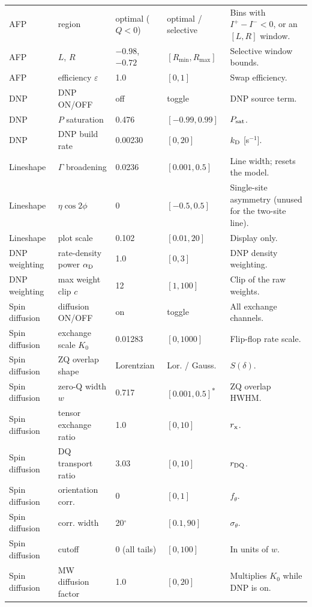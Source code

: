 \documentclass[11pt]{article}
\newcommand{\Iplus}{I^{+}}
\newcommand{\Iminus}{I^{-}}
\begin{document}
\begin{longtable}{@{}L{0.14\textwidth} L{0.20\textwidth} L{0.11\textwidth} L{0.14\textwidth} L{0.30\textwidth}@{}}
\midrule
AFP & region & optimal (\(Q<0\)) & optimal / selective & Bins with \(\Iplus-\Iminus<0\), or an \([L,R]\) window.\\
AFP & \(L\), \(R\) & \(-0.98\), \(-0.72\) & \([R_{\min},R_{\max}]\) & Selective window bounds.\\
AFP & efficiency \(\varepsilon\) & 1.0 & \([0,1]\) & Swap efficiency.\\
\midrule
DNP & DNP ON/OFF & off & toggle & DNP source term.\\
DNP & \(P\) saturation & 0.476 & \([-0.99,0.99]\) & \(P_{\rm sat}\).\\
DNP & DNP build rate & 0.00230 & \([0,20]\) & \(k_{\rm D}\) [s\(^{-1}\)].\\
\midrule
Lineshape & \(\Gamma\) broadening & 0.0236 & \([0.001,0.5]\) & Line width; resets the model.\\
Lineshape & \(\eta\cos2\phi\) & 0 & \([-0.5,0.5]\) & Single-site asymmetry (unused for the two-site line).\\
Lineshape & plot scale & 0.102 & \([0.01,20]\) & Display only.\\
\midrule
DNP weighting & rate-density power \(\alpha_{\rm D}\) & 1.0 & \([0,3]\) & DNP density weighting.\\
DNP weighting & max weight clip \(c\) & 12 & \([1,100]\) & Clip of the raw weights.\\
\midrule
Spin diffusion & diffusion ON/OFF & on & toggle & All exchange channels.\\
Spin diffusion & exchange scale \(K_0\) & 0.01283 & \([0,1000]\) & Flip-flop rate scale.\\
Spin diffusion & ZQ overlap shape & Lorentzian & Lor. / Gauss. & \(S(\delta)\).\\
Spin diffusion & zero-Q width \(w\) & 0.717 & \([0.001,0.5]\)\textsuperscript{*} & ZQ overlap HWHM.\\
Spin diffusion & tensor exchange ratio & 1.0 & \([0,10]\) & \(r_{\rm x}\).\\
Spin diffusion & DQ transport ratio & 3.03 & \([0,10]\) & \(r_{\rm DQ}\).\\
Spin diffusion & orientation corr. & 0 & \([0,1]\) & \(f_\theta\).\\
Spin diffusion & corr. width & 20\(^\circ\) & \([0.1,90]\) & \(\sigma_\theta\).\\
Spin diffusion & cutoff & 0 (all tails) & \([0,100]\) & In units of \(w\).\\
Spin diffusion & MW diffusion factor & 1.0 & \([0,20]\) & Multiplies \(K_0\) while DNP is on.\\

\end{longtable}
\end{document}
